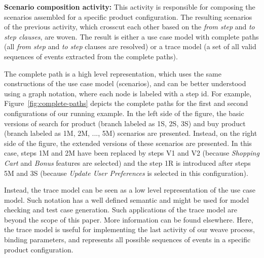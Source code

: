 \documentclass{acm_proc_article-sp}
\begin{document}
 {\bf Scenario composition activity:} This activity is responsible for composing the scenarios assembled for a specific product configuration. 
 The resulting scenarios of the previous activity, which crosscut each other based on the \emph{from step} and \emph{to step clauses}, are woven. The 
 result is either a use case model with complete paths (all \emph{from step} and \emph{to step} clauses are resolved) or a trace model (a set of all valid sequences of events extracted from the complete paths). 
 
The complete path is a high level representation, which uses the same constructions of the use case model (scenarios), and can be better understood using a graph notation, where each node is labeled with a step id. For example, Figure~\ref{fig:complete-paths} depicts the complete paths for the first and second configurations of our running example. In the left side of the figure,  the basic versions of search for product (branch labeled as 1S, 2S, 3S) and buy product (branch labeled as 1M, 2M, ..., 5M) scenarios are presented. Instead, on the right side of the figure, the extended versions of these scenarios are presented. In this case, steps 1M and 2M have been replaced by steps V1 and V2 (because \emph{Shopping Cart} and \emph{Bonus} features are selected) and the step  1R is introduced after steps 5M and 3S (because \emph{Update User Preferences} is selected in this configuration).
 
Instead, the trace model can be seen as a low level representation of the use case model. Such notation has a well defined semantic and might 
be used for model checking and test case generation. Such applications of the trace model are beyond the scope of this paper. More information 
can be found elsewhere\cite{csp-hoare,csp-roscoe,cfeitosa-sbmf-2006}. Here, the trace model is useful for implementing the last activity of our weave process, binding parameters, and 
represents all possible sequences of events in a specific product configuration. 
\end{document}

